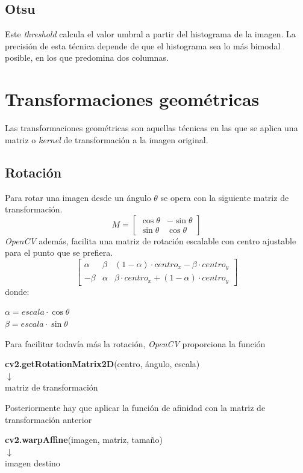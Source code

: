\subsection{ Otsu}
Este \emph{threshold} calcula el valor umbral a partir del histograma
de la imagen. La precisión de esta técnica depende de que el
histograma sea lo más bimodal posible, en los que predomina dos
columnas.

\section{Transformaciones geométricas}
Las transformaciones geométricas son aquellas técnicas en las que se
aplica una matriz o \emph{kernel} de transformación a la imagen
original.
\subsection{Rotación}
Para rotar una imagen desde un ángulo $\theta$ se opera con la
siguiente matriz de transformación.
\begin{equation*}
  M =
  \begin{bmatrix}
    \cos \theta & -\sin \theta \\ \sin \theta & \cos \theta
  \end{bmatrix}
\end{equation*}
\emph{OpenCV} además, facilita una matriz de rotación escalable con
centro ajustable para el punto que se prefiera.
\begin{equation*}
  \begin{bmatrix}
    \alpha & \beta & (1 - \alpha) \cdot centro_x - \beta \cdot centro_y \\
    - \beta & \alpha & \beta \cdot centro_x + (1 - \alpha) \cdot
    centro_y
  \end{bmatrix}
\end{equation*}
donde:
\begin{center}
  $ \alpha = escala \cdot \cos \theta $
  \\
  $ \beta = escala \cdot \sin \theta $
\end{center}
Para facilitar todavía más la rotación, \emph{OpenCV} proporciona la
función
\begin{center}
  \textbf{cv2.getRotationMatrix2D}(centro, ángulo, escala) \\
  $\downarrow$ \\
  matriz de transformación
\end{center}
Posteriormente hay que aplicar la función de afinidad con la matriz de transformación anterior \\
\begin{center}
  \textbf{cv2.warpAffine}(imagen, matriz, tamaño)\\
  $\downarrow$ \\
  imagen destino
\end{center}

